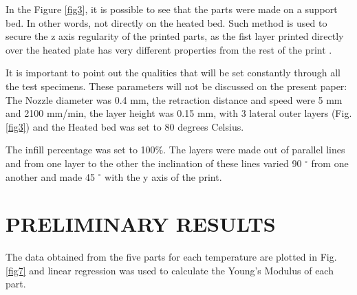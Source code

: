 \documentclass[10pt,fleqn,a4paper,twoside]{article}
\begin{document}
In the Figure \ref{fig3}, it is possible to see that the parts were made on a support bed. In other words, not directly on the heated bed. Such method is used to secure the z axis regularity of the printed parts, as the fist layer printed directly over the heated plate has very different properties from the rest of the print \citep{PETG}. 

It is important to point out the qualities that will be set constantly through all the test specimens. These parameters will not be discussed on the present paper: The Nozzle diameter was 0.4 mm, the retraction distance and speed were 5 mm and 2100 mm/min, the layer height was 0.15 mm, with 3 lateral outer layers (Fig.\ref{fig3}) and the Heated bed was set to 80 degrees Celsius.

The infill percentage was set to 100\%. The layers were made out of parallel lines and from one layer to the other the inclination of these lines varied 90 $^\circ$ from one another and made 45 $^\circ$ with the y axis of the print.









%



\section{PRELIMINARY RESULTS}
The data obtained from the five parts for each temperature are plotted in Fig.\ref{fig7} and linear regression was used to calculate the Young's Modulus of each part.
\end{document}
